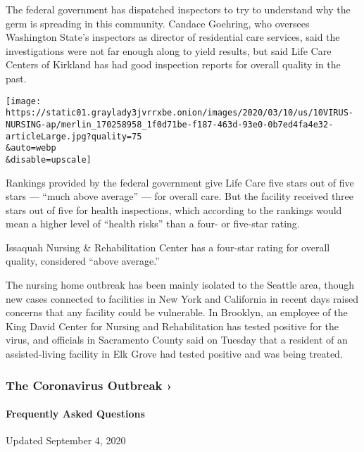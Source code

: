 The federal government has dispatched inspectors to try to understand
why the germ is spreading in this community. Candace Goehring, who
oversees Washington State's inspectors as director of residential care
services, said the investigations were not far enough along to yield
results, but said Life Care Centers of Kirkland has had good inspection
reports for overall quality in the past.

\texttt{[image: https://static01.graylady3jvrrxbe.onion/images/2020/03/10/us/10VIRUS-NURSING-ap/merlin\_170258958\_1f0d71be-f187-463d-93e0-0b7ed4fa4e32-articleLarge.jpg?quality=75\\\&auto=webp\\\&disable=upscale]}

Rankings provided by the federal government give Life Care five stars
out of five stars --- ``much above average'' --- for overall care. But
the facility received three stars out of five for health inspections,
which according to the rankings would mean a higher level of ``health
risks'' than a four- or five-star rating.

Issaquah Nursing \& Rehabilitation Center has a four-star rating for
overall quality, considered ``above average.''

The nursing home outbreak has been mainly isolated to the Seattle area,
though new cases connected to facilities in New York and California in
recent days raised concerns that any facility could be vulnerable. In
Brooklyn, an employee of the King David Center for Nursing and
Rehabilitation has tested positive for the virus, and officials in
Sacramento County said on Tuesday that a resident of an assisted-living
facility in Elk Grove had tested positive and was being treated.

\href{https://www.nytimes3xbfgragh.onion/news-event/coronavirus?action=click\&pgtype=Article\&state=default\&region=MAIN_CONTENT_3\&context=storylines_faq}{}

\hypertarget{the-coronavirus-outbreak-}{%
\subsubsection{The Coronavirus Outbreak
›}\label{the-coronavirus-outbreak-}}

\hypertarget{frequently-asked-questions}{%
\paragraph{Frequently Asked
Questions}\label{frequently-asked-questions}}

Updated September 4, 2020

